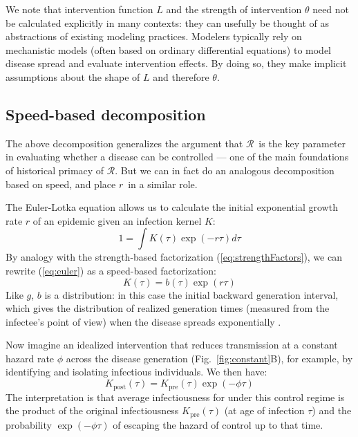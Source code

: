 \documentclass[12pt]{article}
\newcommand{\RR}{\ensuremath{{\mathcal R}}}
\newcommand{\KK}{\ensuremath{{K}}}
\newcommand{\Kx}[1]{\ensuremath{\KK_{\mathrm{#1}}}}
\newcommand{\Kpre}{\Kx{pre}}
\newcommand{\Kpost}{\Kx{post}}
\newcommand{\rr}{\ensuremath{{r}}}
\newcommand{\figref}[1]{Fig.~\ref{fig:#1}}
\renewcommand{\eqref}[1]{(\ref{eq:#1})} %
\newcommand{\eqlab}[1]{\label{eq:#1}}
\begin{document}
We note that intervention function $L$ and the strength of intervention $\theta$ need not be calculated explicitly in many contexts: they can usefully be thought of as abstractions of existing modeling practices.
Modelers typically rely on mechanistic models (often based on ordinary differential equations) to model disease spread and evaluate intervention effects.
By doing so, they make implicit assumptions about the shape of $L$ and therefore $\theta$.

\subsection{Speed-based decomposition}

The above decomposition generalizes the argument that \RR\ is the key parameter in evaluating whether a disease can be controlled --- one of the main foundations of historical primacy of \RR. But we can in fact do an analogous decomposition based on speed, and place \rr\ in a similar role.

The Euler-Lotka equation allows us to calculate the initial exponential growth rate $r$ of an epidemic given an infection kernel $K$:
\begin{equation}
	1 = \int K(\tau) \exp(-r\tau) d\tau
	\eqlab{euler}
\end{equation}
By analogy with the strength-based factorization \eqref{strengthFactors}, we can rewrite \eqref{euler} as a speed-based factorization:
\begin{equation}
K(\tau) = b(\tau)\exp(r\tau)
\eqlab{Kback}
\end{equation}
Like $g$, $b$ is a distribution: in this case the initial backward generation interval, which gives the distribution of realized generation times (measured from the infectee's point of view) when the disease spreads exponentially \citep{champredon2015intrinsic, britton2019estimation}.

Now imagine an idealized intervention that reduces transmission at a constant hazard rate $\phi$ across the disease generation (\figref{constant}B), for example, by identifying and isolating infectious individuals.
We then have:
\begin{equation}
	\Kpost(\tau) = \Kpre(\tau)\exp(-\phi\tau)
\end{equation}
The interpretation is that average infectiousness for under this control regime is the product of the original infectiousness $\Kpre(\tau)$ (at age of infection $\tau$) and the probability $\exp(-\phi\tau)$ of escaping the hazard of control up to that time.
\end{document}
